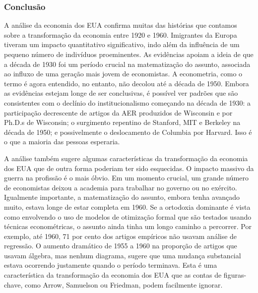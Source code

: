 \documentclass[12pt]{article}
\begin{document}
\subsubsection{\textbf{Conclusão}}
A análise da economia dos EUA confirma muitas das histórias que contamos sobre a transformação da economia entre 1920 e 1960. Imigrantes da Europa tiveram um impacto quantitativo significativo, indo além da influência de um pequeno número de indivíduos proeminentes. As evidências apoiam a ideia de que a década de 1930 foi um período crucial na matematização do assunto, associada ao influxo de uma geração mais jovem de economistas. A econometria, como o termo é agora entendido, no entanto, não decolou até a década de 1950. Embora as evidências estejam longe de ser conclusivas, é possível ver padrões que são consistentes com o declínio do institucionalismo começando na década de 1930: a participação decrescente de artigos da AER produzidos de Wisconsin e por Ph.D.s de Wisconsin; o surgimento repentino de Stanford, MIT e Berkeley na década de 1950; e possivelmente o deslocamento de Columbia por Harvard. Isso é o que a maioria das pessoas esperaria.

A análise também sugere algumas características da transformação da economia dos EUA que de outra forma poderiam ter sido esquecidas. O impacto massivo da guerra na profissão é o mais óbvio. Em um momento crucial, um grande número de economistas deixou a academia para trabalhar no governo ou no exército. Igualmente importante, a matematização do assunto, embora tenha avançado muito, estava longe de estar completa em 1960. Se a ortodoxia dominante é vista como envolvendo o uso de modelos de otimização formal que são testados usando técnicas econométricas, o assunto ainda tinha um longo caminho a percorrer. Por exemplo, até 1960, 71 por cento dos artigos empíricos não usavam análise de regressão. O aumento dramático de 1955 a 1960 na proporção de artigos que usavam álgebra, mas nenhum diagrama, sugere que uma mudança substancial estava ocorrendo justamente quando o período terminava. Esta é uma característica da transformação da economia dos EUA que as contas de figuras-chave, como Arrow, Samuelson ou Friedman, podem facilmente ignorar.
\end{document}
